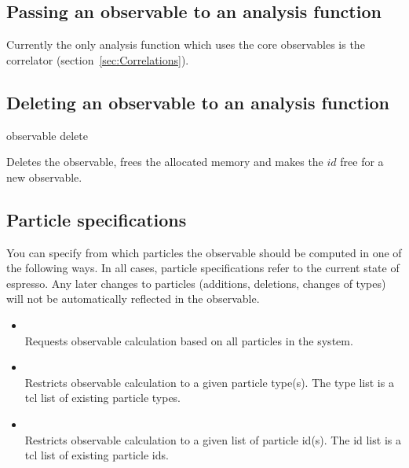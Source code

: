 \subsection{Passing an observable to an analysis function}
Currently the only analysis function which uses the core observables
is the correlator (section~\ref{sec:Correlations}).

\subsection{Deleting an observable to an analysis function}
\begin{essyntax}
observable  delete
\end{essyntax}
Deletes the observable, \ie frees the allocated memory
and makes the $id$ free for a new observable.


\subsection{Particle specifications}
\label{sec:PartSpec}
You can specify from which particles the observable should be computed in one of 
the following ways. In all cases, particle specifications refer to the current
state of espresso. Any later changes to particles (additions, deletions, changes
of types) will not be automatically reflected in the observable.
  \begin{itemize}
    \item {} \\
          Requests observable calculation based on all particles in the system.
    \item {}  \\
          Restricts observable calculation to a given particle type(s). The type
	  list is a tcl list of existing particle types.
    \item {}  \\
          Restricts observable calculation to a given list of particle id(s). The id 
	  list is a tcl list of existing particle ids.
  \end{itemize}

